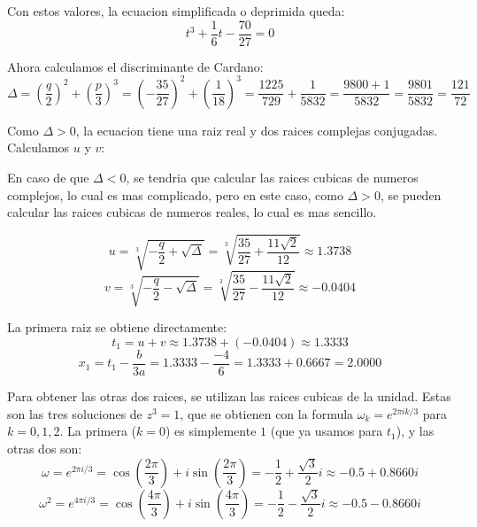 \documentclass[letterpaper,12pt]{article}
\begin{document}
    Con estos valores, la ecuacion simplificada o deprimida queda:
    \begin{equation}
        t^3 + \frac{1}{6}t - \frac{70}{27} = 0
    \end{equation}

    Ahora calculamos el discriminante de Cardano:
    \begin{equation}
        \Delta = \left(\frac{q}{2}\right)^2 + \left(\frac{p}{3}\right)^3 = \left(-\frac{35}{27}\right)^2 + \left(\frac{1}{18}\right)^3 = \frac{1225}{729} + \frac{1}{5832} = \frac{9800 + 1}{5832} = \frac{9801}{5832} = \frac{121}{72}
    \end{equation}

    Como $\Delta > 0$, la ecuacion tiene una raiz real y dos raices complejas conjugadas. Calculamos $u$ y $v$:
    
    En caso de que $\Delta < 0$, se tendria que calcular las raices cubicas de numeros complejos, lo cual es mas complicado, pero en este caso, como $\Delta > 0$, se pueden calcular las raices cubicas de numeros reales, lo cual es mas sencillo.
    
    \begin{equation}
        u = \sqrt[3]{-\frac{q}{2} + \sqrt{\Delta}} = \sqrt[3]{\frac{35}{27} + \frac{11\sqrt{2}}{12}} \approx 1.3738
    \end{equation}
    \begin{equation}
        v = \sqrt[3]{-\frac{q}{2} - \sqrt{\Delta}} = \sqrt[3]{\frac{35}{27} - \frac{11\sqrt{2}}{12}} \approx -0.0404
    \end{equation}

    La primera raiz se obtiene directamente:
    \begin{equation}
        t_1 = u + v \approx 1.3738 + (-0.0404) \approx 1.3333
    \end{equation}
    \begin{equation}
        x_1 = t_1 - \frac{b}{3a} = 1.3333 - \frac{-4}{6} = 1.3333 + 0.6667 = 2.0000
    \end{equation}

    Para obtener las otras dos raices, se utilizan las raices cubicas de la unidad. Estas son las tres soluciones de $z^3 = 1$, que se obtienen con la formula $\omega_k = e^{2\pi i k/3}$ para $k = 0, 1, 2$. La primera ($k=0$) es simplemente $1$ (que ya usamos para $t_1$), y las otras dos son:
    \begin{equation}
        \omega = e^{2\pi i/3} = \cos\left(\frac{2\pi}{3}\right) + i\sin\left(\frac{2\pi}{3}\right) = -\frac{1}{2} + \frac{\sqrt{3}}{2}i \approx -0.5 + 0.8660i
    \end{equation}
    \begin{equation}
        \omega^2 = e^{4\pi i/3} = \cos\left(\frac{4\pi}{3}\right) + i\sin\left(\frac{4\pi}{3}\right) = -\frac{1}{2} - \frac{\sqrt{3}}{2}i \approx -0.5 - 0.8660i
    \end{equation}
\end{document}
